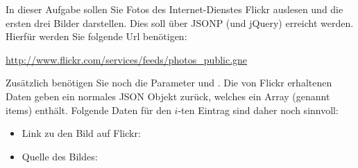 %
\par In dieser Aufgabe sollen Sie Fotos des Internet-Dienstes Flickr auslesen
und die ersten drei Bilder darstellen. Dies soll über JSONP (und jQuery)
erreicht werden. Hierfür werden Sie folgende Url benötigen:
%
\par \url{http://www.flickr.com/services/feeds/photos_public.gne}
%
\par Zusätzlich benötigen Sie noch die Parameter  und
. Die von Flickr erhaltenen Daten geben ein normales JSON
Objekt zurück, welches ein Array (genannt items) enthält. Folgende Daten für
den $i$-ten Eintrag sind daher noch sinnvoll:
%
\begin{itemize}
\item
Link zu den Bild auf Flickr: 
\item
Quelle des Bildes: 
\end{itemize}